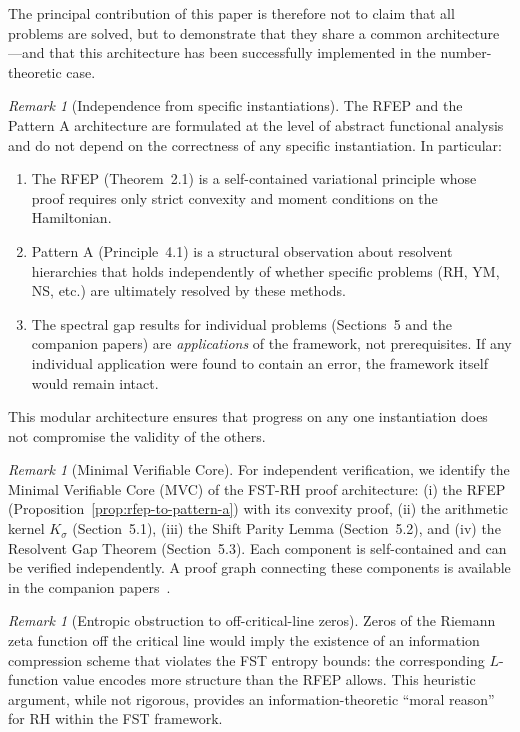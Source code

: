 \documentclass[12pt,a4paper]{article}
\theoremstyle{definition}
\theoremstyle{remark}
\newtheorem{remark}[theorem]{Remark}
\begin{document}
The principal contribution of this paper is therefore not to claim that all problems are solved, but to demonstrate that they share a common architecture---and that this architecture has been successfully implemented in the number-theoretic case.

\begin{remark}[Independence from specific instantiations]
\label{rem:independence}
The RFEP and the Pattern A architecture are formulated at the level of abstract functional analysis and do not depend on the correctness of any specific instantiation. In particular:
\begin{enumerate}
\item The RFEP (Theorem~2.1) is a self-contained variational principle whose proof requires only strict convexity and moment conditions on the Hamiltonian.
\item Pattern A (Principle~4.1) is a structural observation about resolvent hierarchies that holds independently of whether specific problems (RH, YM, NS, etc.) are ultimately resolved by these methods.
\item The spectral gap results for individual problems (Sections~5 and the companion papers) are \emph{applications} of the framework, not prerequisites. If any individual application were found to contain an error, the framework itself would remain intact.
\end{enumerate}
This modular architecture ensures that progress on any one instantiation does not compromise the validity of the others.
\end{remark}

\begin{remark}[Minimal Verifiable Core]
\label{rem:mvc}
For independent verification, we identify the Minimal Verifiable Core (MVC) of the FST-RH proof architecture: (i) the RFEP (Proposition~\ref{prop:rfep-to-pattern-a}) with its convexity proof, (ii) the arithmetic kernel $K_\sigma$ (Section~5.1), (iii) the Shift Parity Lemma (Section~5.2), and (iv) the Resolvent Gap Theorem (Section~5.3). Each component is self-contained and can be verified independently. A proof graph connecting these components is available in the companion papers~\cite{Geiger2026a,Geiger2026b,Geiger2026c}.
\end{remark}

\begin{remark}[Entropic obstruction to off-critical-line zeros]
\label{rem:entropic-obstruction}
Zeros of the Riemann zeta function off the critical line would imply the existence of an information compression scheme that violates the FST entropy bounds: the corresponding $L$-function value encodes more structure than the RFEP allows. This heuristic argument, while not rigorous, provides an information-theoretic ``moral reason'' for RH within the FST framework.
\end{remark}
\end{document}
